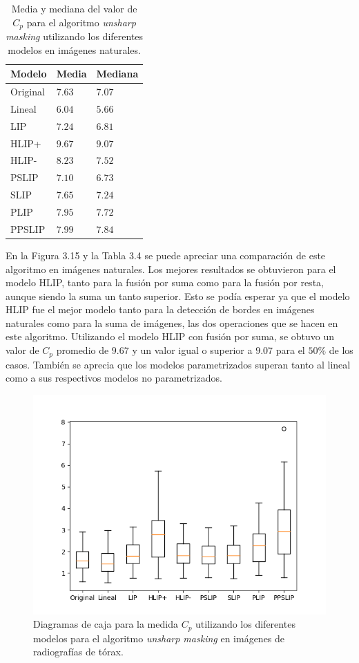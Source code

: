 \begin{table}
	\begin{center}
		\begin{tabular}{|l|l|l|}
			\hline 
			Modelo & Media & Mediana\\
			\hline
			Original & $7.63$ & $7.07$\\
			\hline
			Lineal & $6.04$ & $5.66$\\
			\hline
			LIP & $7.24$ & $6.81$\\
			\hline
			HLIP+ & $9.67$ & $9.07$\\
			\hline
			HLIP- & $8.23$ & $7.52$\\
			\hline
			PSLIP & $7.10$ & $6.73$\\
			\hline
			SLIP & $7.65$ & $7.24$\\
			\hline
			PLIP & $7.95$ & $7.72$\\
			\hline
			PPSLIP & $7.99$ & $7.84$\\
			\hline
		\end{tabular}
		\caption{Media y mediana del valor de $C_p$ para el algoritmo \textit{unsharp masking} utilizando los diferentes modelos en im\'agenes naturales.}
	\end{center}
\end{table}

En la Figura 3.15 y la Tabla 3.4 se puede apreciar una comparaci\'on de este algoritmo en im\'agenes naturales. Los mejores resultados se obtuvieron para el modelo HLIP, tanto para la fusi\'on por suma como para la fusi\'on por resta, aunque siendo la suma un tanto superior. Esto se pod\'ia esperar ya que el modelo HLIP fue el mejor modelo tanto para la detecci\'on de bordes en im\'agenes naturales como para la suma de im\'agenes, las dos operaciones que se hacen en este algoritmo. Utilizando el modelo HLIP con fusi\'on por suma, se obtuvo un valor de $C_p$ promedio de $9.67$ y un valor igual o superior a $9.07$ para el $50\%$ de los casos. Tambi\'en se aprecia que los modelos parametrizados superan tanto al lineal como a sus respectivos modelos no parametrizados.

\begin{figure}
	\begin{center}
		\includegraphics[width=10.0 cm]{images/graphics/torax/unsharp_masking/um_all.png}
		\caption{Diagramas de caja para la medida $C_p$ utilizando los diferentes modelos para el algoritmo \textit{unsharp masking} en im\'agenes de radiograf\'ias de t\'orax.}
	\end{center}
\end{figure}

